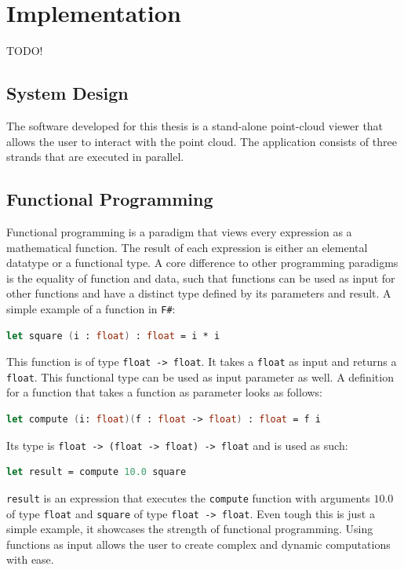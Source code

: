 \chapter{Implementation}
TODO!


\section{System Design}
The software developed for this thesis is a stand-alone point-cloud viewer that allows the user to interact with the point cloud. The application consists of three strands that are executed in parallel. 


\section{Functional Programming}
\label{sec:funprog}

Functional programming is a paradigm that views every expression as a mathematical function. The result of each expression is either an elemental datatype or a functional type. A core difference to other programming paradigms is the equality of function and data, such that functions can be used as input for other functions and have a distinct type defined by its parameters and result. A simple example of a function in \verb|F#|: 

\begin{lstlisting}[language=FSharp]
let square (i : float) : float = i * i 
\end{lstlisting}

This function is of type \verb|float -> float|. It takes a \verb|float| as input and returns a \verb|float|. This functional type can be used as input parameter as well. A definition for a function that takes a function as parameter looks as follows: 

\begin{lstlisting}[language=FSharp]
let compute (i: float)(f : float -> float) : float = f i
\end{lstlisting}
Its type is \verb|float -> (float -> float) -> float| and is used as such: 
\begin{lstlisting}[language=FSharp]
let result = compute 10.0 square
\end{lstlisting}

\verb|result| is an expression that executes the \verb|compute| function with arguments $10.0$ of type \verb|float| and \verb|square| of type \verb|float -> float|. Even tough this is just a simple example, it showcases the strength of functional programming.  Using functions as input allows the user to create complex and dynamic computations with ease. 
\\

